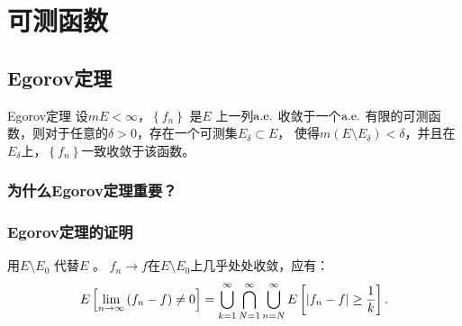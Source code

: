 \chapter{可测函数}
\section{Egorov定理}
\begin{theorem}{Egorov定理}
    设\(mE< \infty \)，\(\left\{ f_{n} \right\}\) 是\(E\)
    上一列\(\text{a.e.}\) 收敛于一个\(\text{a.e.}\) 有限的可测函数，则对于任意的\(\delta > 0\)，存在一个可测集\(E_{\delta}
    \subset E\)，
    使得\(m(E \setminus E_{\delta}) < \delta\)，并且在\(E_{\delta}\)上，\(\left\{ f_{n}
    \right\}\)一致收敛于该函数。
\end{theorem}

\subsection{为什么Egorov定理重要？}
\subsection{Egorov定理的证明}
用\(E\setminus E_{0}\) 代替\(E\) 。
\(f_{n}\to f\)在\(E\setminus E_{0}\)上几乎处处收敛，应有：\[
    E\left[\lim_{n \to \infty} \left( f_{n}-f \right) \neq 0\right]
    = \bigcup_{k=1}^{\infty} \bigcap_{N=1}^{\infty}
    \bigcup_{n=N}^{\infty} E\left[\left|f_{n}-f\right| \geq \frac{1}{k}\right].
\]